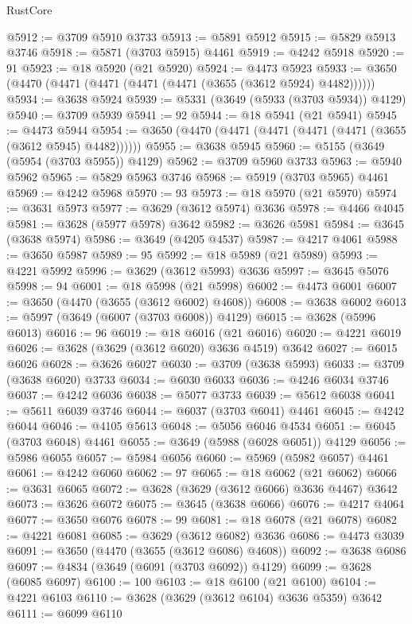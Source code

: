 \begin{lexlean}{RustCore}
\begin{coremodule}
@5912 := @3709 @5910 @3733
@5913 := @5891 @5912
@5915 := @5829 @5913 @3746
@5918 := @5871 (@3703 @5915) @4461
@5919 := @4242 @5918
@5920 := 91
@5923 := @18 @5920 (@21 @5920)
@5924 := @4473 @5923
@5933 := @3650 (@4470 (@4471 (@4471 (@4471 (@4471 (@3655 (@3612 @5924) @4482))))))
@5934 := @3638 @5924
@5939 := @5331 (@3649 (@5933 (@3703 @5934)) @4129)
@5940 := @3709 @5939
@5941 := 92
@5944 := @18 @5941 (@21 @5941)
@5945 := @4473 @5944
@5954 := @3650 (@4470 (@4471 (@4471 (@4471 (@4471 (@3655 (@3612 @5945) @4482))))))
@5955 := @3638 @5945
@5960 := @5155 (@3649 (@5954 (@3703 @5955)) @4129)
@5962 := @3709 @5960 @3733
@5963 := @5940 @5962
@5965 := @5829 @5963 @3746
@5968 := @5919 (@3703 @5965) @4461
@5969 := @4242 @5968
@5970 := 93
@5973 := @18 @5970 (@21 @5970)
@5974 := @3631 @5973
@5977 := @3629 (@3612 @5974) @3636
@5978 := @4466 @4045
@5981 := @3628 (@5977 @5978) @3642
@5982 := @3626 @5981
@5984 := @3645 (@3638 @5974)
@5986 := @3649 (@4205 @4537)
@5987 := @4217 @4061
@5988 := @3650 @5987
@5989 := 95
@5992 := @18 @5989 (@21 @5989)
@5993 := @4221 @5992
@5996 := @3629 (@3612 @5993) @3636
@5997 := @3645 @5076
@5998 := 94
@6001 := @18 @5998 (@21 @5998)
@6002 := @4473 @6001
@6007 := @3650 (@4470 (@3655 (@3612 @6002) @4608))
@6008 := @3638 @6002
@6013 := @5997 (@3649 (@6007 (@3703 @6008)) @4129)
@6015 := @3628 (@5996 @6013)
@6016 := 96
@6019 := @18 @6016 (@21 @6016)
@6020 := @4221 @6019
@6026 := @3628 (@3629 (@3612 @6020) @3636 @4519) @3642
@6027 := @6015 @6026
@6028 := @3626 @6027
@6030 := @3709 (@3638 @5993)
@6033 := @3709 (@3638 @6020) @3733
@6034 := @6030 @6033
@6036 := @4246 @6034 @3746
@6037 := @4242 @6036
@6038 := @5077 @3733
@6039 := @5612 @6038
@6041 := @5611 @6039 @3746
@6044 := @6037 (@3703 @6041) @4461
@6045 := @4242 @6044
@6046 := @4105 @5613
@6048 := @5056 @6046 @4534
@6051 := @6045 (@3703 @6048) @4461
@6055 := @3649 (@5988 (@6028 @6051)) @4129
@6056 := @5986 @6055
@6057 := @5984 @6056
@6060 := @5969 (@5982 @6057) @4461
@6061 := @4242 @6060
@6062 := 97
@6065 := @18 @6062 (@21 @6062)
@6066 := @3631 @6065
@6072 := @3628 (@3629 (@3612 @6066) @3636 @4467) @3642
@6073 := @3626 @6072
@6075 := @3645 (@3638 @6066)
@6076 := @4217 @4064
@6077 := @3650 @6076
@6078 := 99
@6081 := @18 @6078 (@21 @6078)
@6082 := @4221 @6081
@6085 := @3629 (@3612 @6082) @3636
@6086 := @4473 @3039
@6091 := @3650 (@4470 (@3655 (@3612 @6086) @4608))
@6092 := @3638 @6086
@6097 := @4834 (@3649 (@6091 (@3703 @6092)) @4129)
@6099 := @3628 (@6085 @6097)
@6100 := 100
@6103 := @18 @6100 (@21 @6100)
@6104 := @4221 @6103
@6110 := @3628 (@3629 (@3612 @6104) @3636 @5359) @3642
@6111 := @6099 @6110

\end{coremodule}
\end{lexlean}

